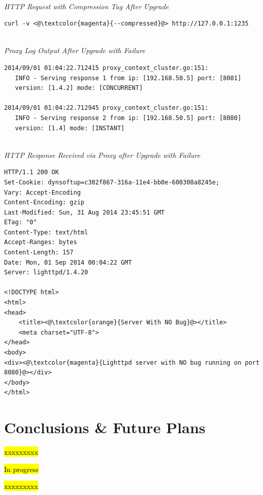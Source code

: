 \documentclass[a4paper,11pt,twoside]{report}
\begin{document}
\noindent \\
\textit{HTTP Request with Compression Tag After Upgrade} 
\begin{lstlisting}[language=terminal]
curl -v <@\textcolor{magenta}{--compressed}@> http://127.0.0.1:1235 
\end{lstlisting}  

\noindent \\
\textit{Proxy Log Output After Upgrade with Failure}
\begin{lstlisting}[language=terminal]
2014/09/01 01:04:22.712415 proxy_context_cluster.go:151:     
   INFO - Serving response 1 from ip: [192.168.50.5] port: [8081] 
   version: [1.4.2] mode: [CONCURRENT]
   
2014/09/01 01:04:22.712945 proxy_context_cluster.go:151:     
   INFO - Serving response 2 from ip: [192.168.50.5] port: [8080] 
   version: [1.4] mode: [INSTANT]
\end{lstlisting} 

\noindent\\
\textit{HTTP Response Received via Proxy after Upgrade with Failure}  
\begin{lstlisting}[language=terminal]
HTTP/1.1 200 OK
Set-Cookie: dynsoftup=c302f867-316a-11e4-bb0e-600308a8245e;
Vary: Accept-Encoding
Content-Encoding: gzip
Last-Modified: Sun, 31 Aug 2014 23:45:51 GMT
ETag: "0"
Content-Type: text/html
Accept-Ranges: bytes
Content-Length: 157
Date: Mon, 01 Sep 2014 00:04:22 GMT
Server: lighttpd/1.4.20
 
<!DOCTYPE html>
<html>
<head>
    <title><@\textcolor{orange}{Server With NO Bug}@></title>
    <meta charset="UTF-8">
</head>
<body>
<div><@\textcolor{magenta}{Lighttpd server with NO bug running on port 8080}@></div>
</body>
</html>
\end{lstlisting} 




\clearpage



\chapter{Conclusions \& Future Plans}
\hl{xxxxxxxxx}\bigskip

\noindent
\hl{In progress}\bigskip

\noindent
\hl{xxxxxxxxx}\bigskip


\clearpage
\end{document}
